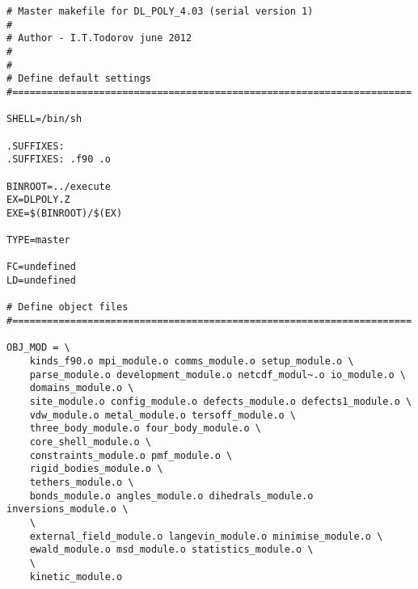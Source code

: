 \begin{verbatim}
# Master makefile for DL_POLY_4.03 (serial version 1)
#
# Author - I.T.Todorov june 2012
#
#
# Define default settings
#=====================================================================

SHELL=/bin/sh

.SUFFIXES:
.SUFFIXES: .f90 .o

BINROOT=../execute
EX=DLPOLY.Z
EXE=$(BINROOT)/$(EX)

TYPE=master

FC=undefined
LD=undefined

# Define object files
#=====================================================================

OBJ_MOD = \
	kinds_f90.o mpi_module.o comms_module.o setup_module.o \
	parse_module.o development_module.o netcdf_modul~.o io_module.o \
	domains_module.o \
	site_module.o config_module.o defects_module.o defects1_module.o \
	vdw_module.o metal_module.o tersoff_module.o \
	three_body_module.o four_body_module.o \
	core_shell_module.o \
	constraints_module.o pmf_module.o \
	rigid_bodies_module.o \
	tethers_module.o \
	bonds_module.o angles_module.o dihedrals_module.o inversions_module.o \
	\
	external_field_module.o langevin_module.o minimise_module.o \
	ewald_module.o msd_module.o statistics_module.o \
	\
	kinetic_module.o


\end{verbatim}
